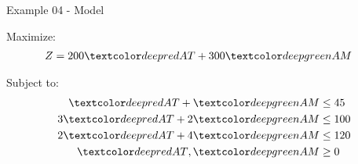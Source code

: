 \begin{frame}{Example 04 - Model}

Maximize:
\begin{align*}
    Z &= 200\colora{AT} + 300\colorb{AM}
\end{align*}

Subject to:
\begin{align*}
     \colora{AT} +  \colorb{AM} &\le 45 \\
    3\colora{AT} + 2\colorb{AM} &\le 100 \\
    2\colora{AT} + 4\colorb{AM} &\le 120 \\
     \colora{AT}, \colorb{AM} &\ge 0
\end{align*}

\end{frame}
